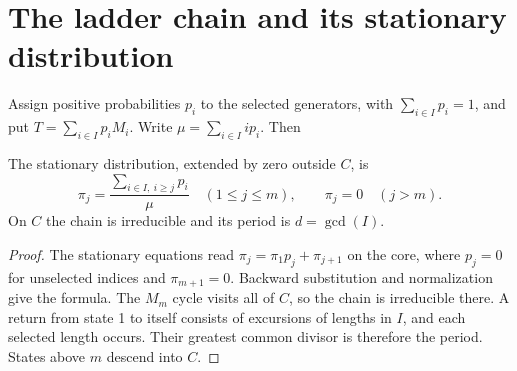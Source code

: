 

\section{The ladder chain and its stationary distribution}
Assign positive probabilities $p_i$ to the selected generators, with
$\sum_{i\in I}p_i=1$, and put $T=\sum_{i\in I}p_iM_i$.
Write $\mu=\sum_{i\in I}i p_i$. Then
\begin{proposition}\label{ptc-book:stationary}
The stationary distribution, extended by zero outside $C$, is
\[
 \pi_j=\frac{\sum_{i\in I,\ i\ge j}p_i}{\mu}\quad(1\le j\le m),
 \qquad \pi_j=0\quad(j>m).
\]
On $C$ the chain is irreducible and its period is $d=\gcd(I)$.
\end{proposition}
\begin{proof}
The stationary equations read $\pi_j=\pi_1p_j+\pi_{j+1}$ on the core,
where $p_j=0$ for unselected indices and $\pi_{m+1}=0$. Backward substitution
and normalization give the formula. The $M_m$ cycle visits all of $C$, so
the chain is irreducible there. A return from state 1 to itself consists of
excursions of lengths in $I$, and each selected length occurs. Their greatest
common divisor is therefore the period. States above $m$ descend into $C$.
\end{proof}
